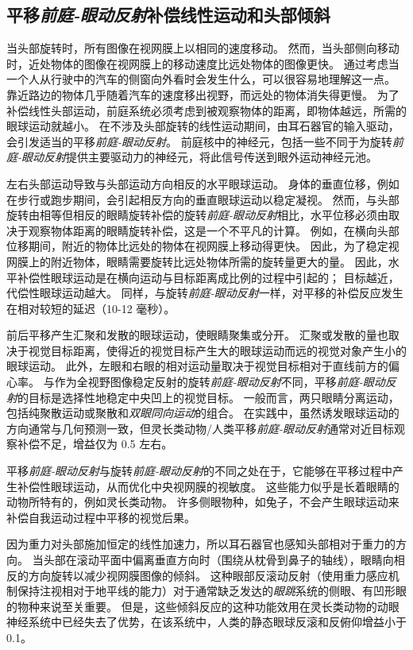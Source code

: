 \subsection{平移\textit{前庭-眼动反射}补偿线性运动和头部倾斜}

当头部旋转时，所有图像在视网膜上以相同的速度移动。
然而，当头部侧向移动时，近处物体的图像在视网膜上的移动速度比远处物体的图像更快。
通过考虑当一个人从行驶中的汽车的侧窗向外看时会发生什么，可以很容易地理解这一点。
靠近路边的物体几乎随着汽车的速度移出视野，而远处的物体消失得更慢。
为了补偿线性头部运动，前庭系统必须考虑到被观察物体的距离，即物体越远，所需的眼球运动就越小。
在不涉及头部旋转的线性运动期间，由耳石器官的输入驱动，会引发适当的平移\textit{前庭-眼动反射}。
前庭核中的神经元，包括一些不同于为旋转\textit{前庭-眼动反射}提供主要驱动力的神经元，将此信号传送到眼外运动神经元池。


左右头部运动导致与头部运动方向相反的水平眼球运动。
身体的垂直位移，例如在步行或跑步期间，会引起相反方向的垂直眼球运动以稳定凝视。
然而，与头部旋转由相等但相反的眼睛旋转补偿的旋转\textit{前庭-眼动反射}相比，水平位移必须由取决于观察物体距离的眼睛旋转补偿，这是一个不平凡的计算。
例如，在横向头部位移期间，附近的物体比远处的物体在视网膜上移动得更快。
因此，为了稳定视网膜上的附近物体，眼睛需要旋转比远处物体所需的旋转量更大的量。
因此，水平补偿性眼球运动是在横向运动与目标距离成比例的过程中引起的；
目标越近，代偿性眼球运动越大。
同样，与旋转\textit{前庭-眼动反射}一样，对平移的补偿反应发生在相对较短的延迟（10-12 毫秒）。


前后平移产生汇聚和发散的眼球运动，使眼睛聚集或分开。
汇聚或发散的量也取决于视觉目标距离，使得近的视觉目标产生大的眼球运动而远的视觉对象产生小的眼球运动。
此外，左眼和右眼的相对运动量取决于视觉目标相对于直线前方的偏心率。
与作为全视野图像稳定反射的旋转\textit{前庭-眼动反射}不同，平移\textit{前庭-眼动反射}的目标是选择性地稳定中央凹上的视觉目标。
一般而言，两只眼睛分离运动，包括纯聚散运动或聚散和\textit{双眼同向运动}的组合。
在实践中，虽然诱发眼球运动的方向通常与几何预测一致，但灵长类动物/人类平移\textit{前庭-眼动反射}通常对近目标观察补偿不足，增益仅为 0.5 左右。


平移\textit{前庭-眼动反射}与旋转\textit{前庭-眼动反射}的不同之处在于，它能够在平移过程中产生补偿性眼球运动，从而优化中央视网膜的视敏度。
这些能力似乎是长着眼睛的动物所特有的，例如灵长类动物。
许多侧眼物种，如兔子，不会产生眼球运动来补偿自我运动过程中平移的视觉后果。


因为重力对头部施加恒定的线性加速力，所以耳石器官也感知头部相对于重力的方向。
当头部在滚动平面中偏离垂直方向时（围绕从枕骨到鼻子的轴线），眼睛向相反的方向旋转以减少视网膜图像的倾斜。
这种眼部反滚动反射（使用重力感应机制保持注视相对于地平线的能力）对于通常缺乏发达的\textit{眼跳}系统的侧眼、有凹形眼的物种来说至关重要。
但是，这些倾斜反应的这种功能效用在灵长类动物的动眼神经系统中已经失去了优势，在该系统中，人类的静态眼球反滚和反俯仰增益小于 0.1。



